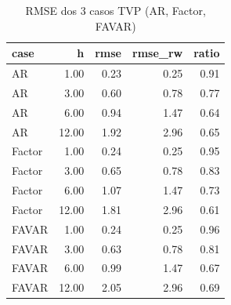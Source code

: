 \begin{table}[ht]
\centering
\begin{tabular}{lrrrr}
  \hline
case & h & rmse & rmse\_rw & ratio \\ 
  \hline
AR & 1.00 & 0.23 & 0.25 & 0.91 \\ 
  AR & 3.00 & 0.60 & 0.78 & 0.77 \\ 
  AR & 6.00 & 0.94 & 1.47 & 0.64 \\ 
  AR & 12.00 & 1.92 & 2.96 & 0.65 \\ 
  Factor & 1.00 & 0.24 & 0.25 & 0.95 \\ 
  Factor & 3.00 & 0.65 & 0.78 & 0.83 \\ 
  Factor & 6.00 & 1.07 & 1.47 & 0.73 \\ 
  Factor & 12.00 & 1.81 & 2.96 & 0.61 \\ 
  FAVAR & 1.00 & 0.24 & 0.25 & 0.96 \\ 
  FAVAR & 3.00 & 0.63 & 0.78 & 0.81 \\ 
  FAVAR & 6.00 & 0.99 & 1.47 & 0.67 \\ 
  FAVAR & 12.00 & 2.05 & 2.96 & 0.69 \\ 
   \hline
\end{tabular}
\caption{RMSE dos 3 casos TVP (AR, Factor, FAVAR)} 
\label{tab:tvp_3cases}
\end{table}
